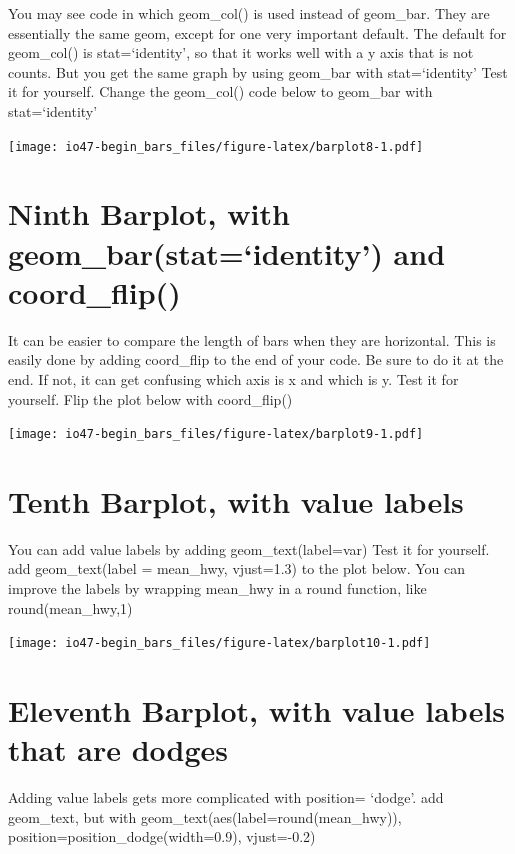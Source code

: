 \documentclass[
]{book}
\begin{document}
You may see code in which geom\_col() is used instead of geom\_bar. They are essentially the same geom, except for one very important default. The default for geom\_col() is stat=`identity', so that it works well with a y axis that is not counts. But you get the same graph by using geom\_bar with stat=`identity'
Test it for yourself.
Change the geom\_col() code below to geom\_bar with stat=`identity'

\texttt{[image: io47-begin\_bars\_files/figure-latex/barplot8-1.pdf]}

\hypertarget{ninth-barplot-with-geom_barstatidentity-and-coord_flip}{%
\section{Ninth Barplot, with geom\_bar(stat=`identity') and coord\_flip()}\label{ninth-barplot-with-geom_barstatidentity-and-coord_flip}}

It can be easier to compare the length of bars when they are horizontal. This is easily done by adding coord\_flip to the end of your code. Be sure to do it at the end. If not, it can get confusing which axis is x and which is y.
Test it for yourself.
Flip the plot below with coord\_flip()

\texttt{[image: io47-begin\_bars\_files/figure-latex/barplot9-1.pdf]}

\hypertarget{tenth-barplot-with-value-labels}{%
\section{Tenth Barplot, with value labels}\label{tenth-barplot-with-value-labels}}

You can add value labels by adding geom\_text(label=var)
Test it for yourself.
add geom\_text(label = mean\_hwy, vjust=1.3) to the plot below.
You can improve the labels by wrapping mean\_hwy in a round function, like round(mean\_hwy,1)

\texttt{[image: io47-begin\_bars\_files/figure-latex/barplot10-1.pdf]}

\hypertarget{eleventh-barplot-with-value-labels-that-are-dodges}{%
\section{Eleventh Barplot, with value labels that are dodges}\label{eleventh-barplot-with-value-labels-that-are-dodges}}

Adding value labels gets more complicated with position= `dodge'.
add geom\_text, but with
geom\_text(aes(label=round(mean\_hwy)), position=position\_dodge(width=0.9), vjust=-0.2)
\end{document}
